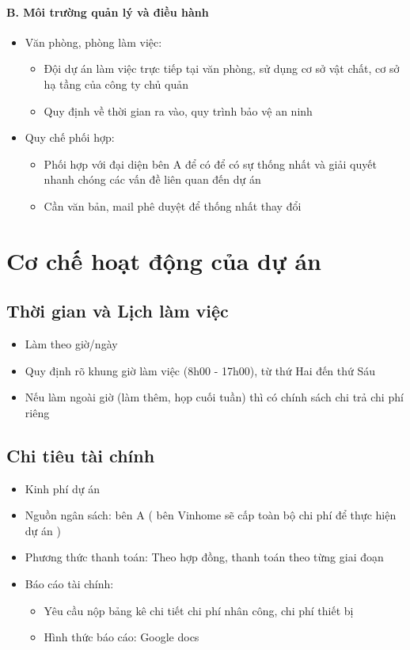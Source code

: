 \paragraph{B. Môi trường quản lý và điều hành}
\begin{itemize}
    \item Văn phòng, phòng làm việc:
    \begin{itemize}
        \item Đội dự án làm việc trực tiếp tại văn phòng, sử dụng cơ sở vật chất, cơ sở hạ tầng của công ty chủ quản
        \item Quy định về thời gian ra vào, quy trình bảo vệ an ninh
    \end{itemize}
    \item Quy chế phối hợp:
    \begin{itemize}
        \item Phối hợp với đại diện bên A để có để có sự thống nhất và giải quyết nhanh chóng các vấn đề liên quan đến dự án
        \item Cần văn bản, mail phê duyệt để thống nhất thay đổi
    \end{itemize}
\end{itemize}

\section{Cơ chế hoạt động của dự án}
\subsection{Thời gian và Lịch làm việc}
\begin{itemize}
    \item Làm theo giờ/ngày
    \item Quy định rõ khung giờ làm việc (8h00 - 17h00), từ thứ Hai đến thứ Sáu
    \item Nếu làm ngoài giờ (làm thêm, họp cuối tuần) thì có chính sách chi trả chi phí riêng
\end{itemize}
\subsection{Chi tiêu tài chính}
\begin{itemize}
    \item Kinh phí dự án
    \item Nguồn ngân sách: bên A ( bên Vinhome sẽ cấp toàn bộ chi phí để thực hiện dự án )
    \item Phương thức thanh toán: Theo hợp đồng, thanh toán theo từng giai đoạn
    \item Báo cáo tài chính:
    \begin{itemize}
        \item Yêu cầu nộp bảng kê chi tiết chi phí nhân công, chi phí thiết bị
        \item Hình thức báo cáo: Google docs
    \end{itemize}
\end{itemize}
